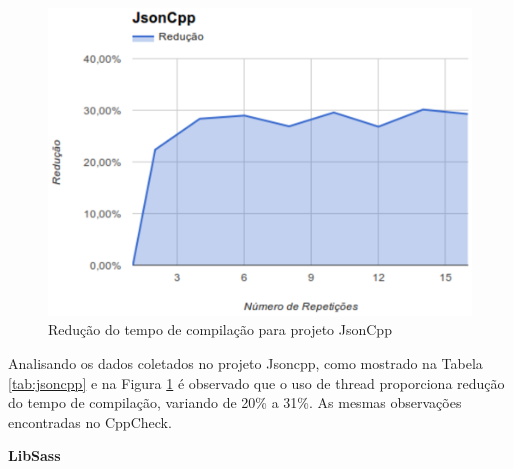 \begin{figure}[h]
    \centering
        \includegraphics[keepaspectratio=true,scale=1]{figuras/jsoncpp.eps}
    \caption{Redução do tempo de compilação para projeto JsonCpp}
    \label{jsoncpp}
\end{figure}
Analisando os dados coletados no projeto Jsoncpp, como mostrado na Tabela \ref{tab:jsoncpp} e na Figura \ref{jsoncpp} é observado
 que o uso de thread proporciona
 redução do tempo de compilação, variando de 20\% a 31\%.
As mesmas observações encontradas no CppCheck.

\textbf{LibSass}

